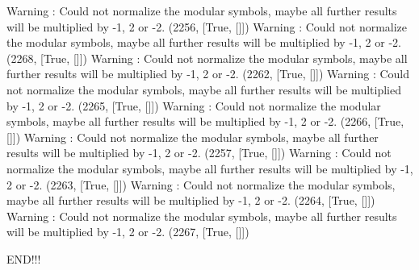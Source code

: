 Warning : Could not normalize the modular symbols, maybe all further results will be multiplied by -1, 2 or -2.
(2256, [True, []])
Warning : Could not normalize the modular symbols, maybe all further results will be multiplied by -1, 2 or -2.
(2268, [True, []])
Warning : Could not normalize the modular symbols, maybe all further results will be multiplied by -1, 2 or -2.
(2262, [True, []])
Warning : Could not normalize the modular symbols, maybe all further results will be multiplied by -1, 2 or -2.
(2265, [True, []])
Warning : Could not normalize the modular symbols, maybe all further results will be multiplied by -1, 2 or -2.
(2266, [True, []])
Warning : Could not normalize the modular symbols, maybe all further results will be multiplied by -1, 2 or -2.
(2257, [True, []])
Warning : Could not normalize the modular symbols, maybe all further results will be multiplied by -1, 2 or -2.
(2263, [True, []])
Warning : Could not normalize the modular symbols, maybe all further results will be multiplied by -1, 2 or -2.
(2264, [True, []])
Warning : Could not normalize the modular symbols, maybe all further results will be multiplied by -1, 2 or -2.
(2267, [True, []])


END!!!
